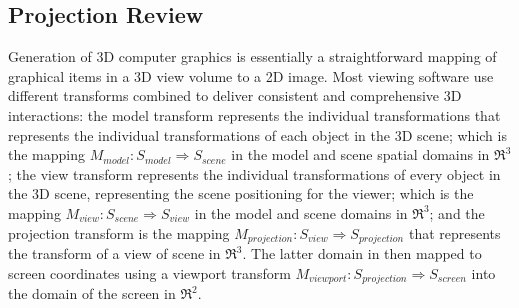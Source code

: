 \subsection{Projection Review}
\label{sec.projection_review}




Generation of 3D computer graphics is essentially a straightforward mapping of graphical items in a 3D view volume to a 2D image. Most viewing software use different transforms combined to deliver consistent and comprehensive 3D interactions: the model transform represents the individual transformations that represents the individual transformations of each object in the 3D scene; which is the mapping $M_{model}: S_{model} \Rightarrow S_{scene}$ in the model and scene spatial domains in $\Re^3$; the view transform represents the individual transformations of every object in the 3D scene, representing the scene positioning for the viewer; which is the mapping $M_{view}: S_{scene} \Rightarrow S_{view}$ in the model and scene domains in $\Re^3$; and the projection transform is the mapping $M_{projection}:S_{view} \Rightarrow S_{projection}$ that represents the transform of a view of scene in $\Re^3$. The latter domain in then mapped to screen coordinates using a viewport transform $M_{viewport}:S_{projection} \Rightarrow S_{screen}$ into the domain of the screen in $\Re^2$.

